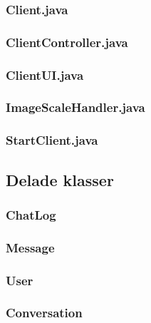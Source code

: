 \documentclass[a4paper,11pt]{article}
\begin{document}
		\subsubsection{Client.java}
		
		\subsubsection{ClientController.java}
		
		\subsubsection{ClientUI.java}
		
		\subsubsection{ImageScaleHandler.java}
		
		\subsubsection{StartClient.java}
		

	\subsection{Delade klasser}
		\subsubsection{ChatLog}
			
			\subsubsection{Message}
			
			\subsubsection{User}
			
			\subsubsection{Conversation}
			
\end{document}
